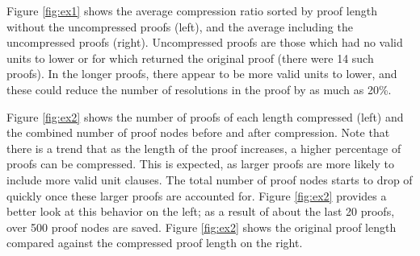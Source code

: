 
Figure \ref{fig:ex1} shows the average compression ratio sorted by proof length without the uncompressed proofs (left), and the average including the uncompressed proofs (right). Uncompressed proofs are those which had no valid units to lower or for which \SFOLowerUnits returned the original proof (there were 14 such proofs). In the longer proofs, there appear to be more valid units to lower, and these could reduce the number of resolutions in the proof by as much as 20\%.

Figure \ref{fig:ex2} shows the number of proofs of each length compressed (left) and the combined number of proof nodes before and after compression. Note that there is a trend that as the length of the proof increases, a higher percentage of proofs can be compressed. This is expected, as larger proofs are more likely to include more valid unit clauses. The total number of proof nodes starts to drop of quickly once these larger proofs are accounted for. Figure \ref{fig:ex2} provides a better look at this behavior on the left; as a result of about the last 20 proofs, over 500 proof nodes are saved. Figure \ref{fig:ex2} shows the original proof length compared against the compressed proof length on the right.






